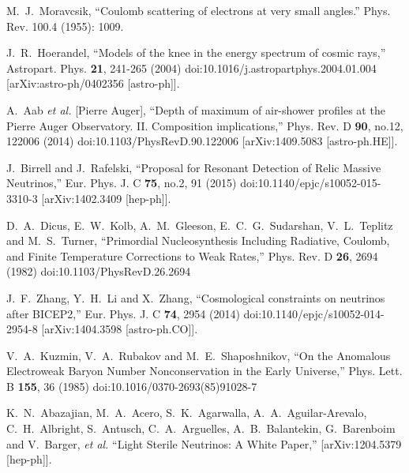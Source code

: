 \documentclass[universe,article,submit,moreauthors,pdftex,a4paper]{Definitions/mdpi}
\begin{document}
\begin{thebibliography}{99}
M.~J.~Moravcsik, ``Coulomb scattering of electrons at very small angles.'' Phys. Rev. 100.4 (1955): 1009.

J.~R.~Hoerandel,
``Models of the knee in the energy spectrum of cosmic rays,''
Astropart. Phys. \textbf{21}, 241-265 (2004)
doi:10.1016/j.astropartphys.2004.01.004
[arXiv:astro-ph/0402356 [astro-ph]].

A.~Aab \textit{et al.} [Pierre Auger],
``Depth of maximum of air-shower profiles at the Pierre Auger Observatory. II. Composition implications,''
Phys. Rev. D \textbf{90}, no.12, 122006 (2014)
doi:10.1103/PhysRevD.90.122006
[arXiv:1409.5083 [astro-ph.HE]].

J.~Birrell and J.~Rafelski,
``Proposal for Resonant Detection of Relic Massive Neutrinos,''
Eur. Phys. J. C \textbf{75}, no.2, 91 (2015)
doi:10.1140/epjc/s10052-015-3310-3
[arXiv:1402.3409 [hep-ph]].

D.~A.~Dicus, E.~W.~Kolb, A.~M.~Gleeson, E.~C.~G.~Sudarshan, V.~L.~Teplitz and M.~S.~Turner,
``Primordial Nucleosynthesis Including Radiative, Coulomb, and Finite Temperature Corrections to Weak Rates,''
Phys. Rev. D \textbf{26}, 2694 (1982)
doi:10.1103/PhysRevD.26.2694

J.~F.~Zhang, Y.~H.~Li and X.~Zhang,
``Cosmological constraints on neutrinos after BICEP2,''
Eur. Phys. J. C \textbf{74}, 2954 (2014)
doi:10.1140/epjc/s10052-014-2954-8
[arXiv:1404.3598 [astro-ph.CO]].

V.~A.~Kuzmin, V.~A.~Rubakov and M.~E.~Shaposhnikov,
``On the Anomalous Electroweak Baryon Number Nonconservation in the Early Universe,''
Phys. Lett. B \textbf{155}, 36 (1985)
doi:10.1016/0370-2693(85)91028-7

K.~N.~Abazajian, M.~A.~Acero, S.~K.~Agarwalla, A.~A.~Aguilar-Arevalo, C.~H.~Albright, S.~Antusch, C.~A.~Arguelles, A.~B.~Balantekin, G.~Barenboim and V.~Barger, \textit{et al.}
``Light Sterile Neutrinos: A White Paper,''
[arXiv:1204.5379 [hep-ph]].


\end{thebibliography}
\end{document}
